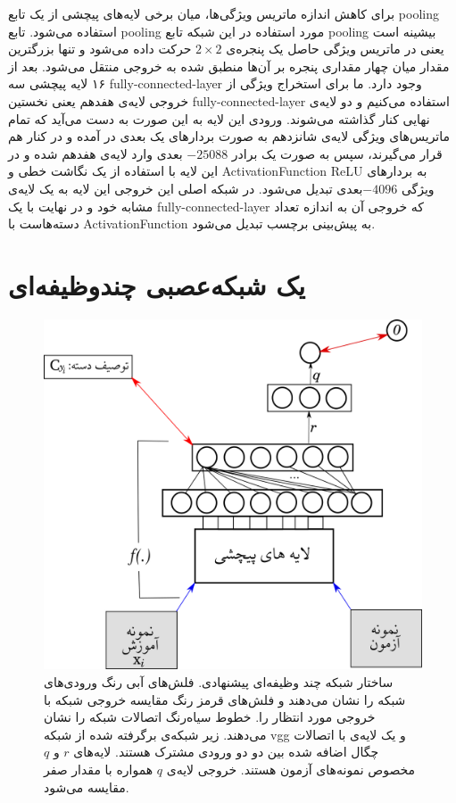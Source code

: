  برای کاهش اندازه ماتریس ویژگی‌ها، میان برخی لایه‌های پیچشی از یک تابع \gls{pooling} استفاده می‌شود. تابع \gls{pooling} مورد استفاده در این شبکه تابع \gls{pooling} بیشینه است یعنی در ماتریس ویژگی‌ حاصل یک پنجره‌ی $2 \times 2$ حرکت داده می‌شود و تنها بزرگترین مقدار میان چهار مقداری پنجره بر آن‌ها منطبق شده به خروجی منتقل می‌شود. بعد از ۱۶ لایه پیچشی سه \gls{fully-connected-layer} وجود دارد. ما برای استخراج ویژگی از خروجی لایه‌ی هفدهم یعنی نخستین  \gls{fully-connected-layer} استفاده می‌کنیم و دو لایه‌ی نهایی کنار گذاشته می‌شوند. ورودی این لایه به این صورت به دست می‌آید که تمام ماتریس‌های ویژگی لایه‌ی شانزدهم به صورت بردارهای یک بعدی در آمده و در کنار هم قرار می‌گیرند، سپس به صورت یک برادر $-25088$ بعدی وارد لایه‌ی هفدهم شده و در این لایه با استفاده از یک نگاشت خطی و \gls{ActivationFunction}   \gls{ReLU} به بردارهای ویژگی $-4096$بعدی تبدیل می‌شود. در شبکه اصلی این خروجی این لایه به یک لایه‌ی مشابه خود و در نهایت با یک  \gls{fully-connected-layer} که خروجی آن به اندازه تعداد دسته‌هاست با  \gls{ActivationFunction}
 به پیش‌بینی برچسب تبدیل می‌شود.

\section{یک شبکه‌عصبی چندوظیفه‌ای}\label{nn}
\begin{figure}[!t]
\centering
\includegraphics[width=0.85\linewidth]{images/net}
\caption[شبکه‌ی چندوظیفه‌ای پیشنهادی]{
ساختار شبکه چند وظیفه‌ای پیشنهادی. فلش‌های آبی رنگ ورودی‌های شبکه را نشان می‌دهند و فلش‌های قرمز رنگ مقایسه خروجی شبکه با خروجی مورد انتظار را. خطوط سیاه‌رنگ اتصالات شبکه‌ را نشان می‌دهند. زیر شبکه‌ی برگرفته شده از شبکه vgg و یک لایه‌ی با اتصالات چگال اضافه شده بین دو دو ورودی مشترک هستند. لایه‌های $r$ و $q$ مخصوص نمونه‌های آزمون هستند. خروجی لایه‌ی $q$ همواره با مقدار صفر مقایسه می‌شود.
}
\label{fig:nn2}
\end{figure}

